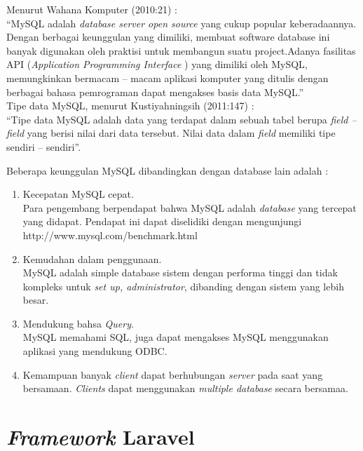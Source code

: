 Menurut Wahana Komputer (2010:21) : \\
“MySQL adalah \textit{database server open source} yang cukup popular keberadaannya. Dengan berbagai keunggulan yang dimiliki, membuat software database ini banyak digunakan oleh praktisi untuk membangun suatu project.Adanya fasilitas API (\textit{Application Programming Interface} ) yang dimiliki oleh MySQL, memungkinkan bermacam – macam aplikasi komputer yang ditulis dengan berbagai bahasa pemrograman dapat mengakses basis data MySQL.” \\

Tipe data MySQL, menurut Kustiyahningsih (2011:147) : \\
“Tipe data MySQL adalah data yang terdapat dalam sebuah tabel berupa \textit{field – field} yang berisi nilai dari data tersebut. Nilai data dalam \textit{field} memiliki tipe sendiri – sendiri”.

Beberapa keunggulan MySQL dibandingkan dengan database lain adalah \cite{5} :

\begin{enumerate}

\item Kecepatan MySQL cepat. \\
Para pengembang berpendapat bahwa MySQL adalah \textit{database} yang tercepat yang didapat. Pendapat ini dapat diselidiki dengan mengunjungi http://www.mysql.com/benchmark.html

\item Kemudahan dalam penggunaan. \\
MySQL adalah simple database sistem dengan performa tinggi dan tidak kompleks untuk \textit{set up, administrator}, dibanding dengan sistem yang lebih besar.

\item Mendukung bahsa \textit{Query}. \\
MySQL memahami SQL, juga dapat mengakses MySQL menggunakan aplikasi yang mendukung ODBC.

\item Kemampuan banyak \textit{client} dapat berhubungan \textit{server} pada saat yang bersamaan. \textit{Clients} dapat menggunakan \textit{multiple database} secara bersamaa. 

\end{enumerate} 

\section{\textit{Framework} Laravel}

